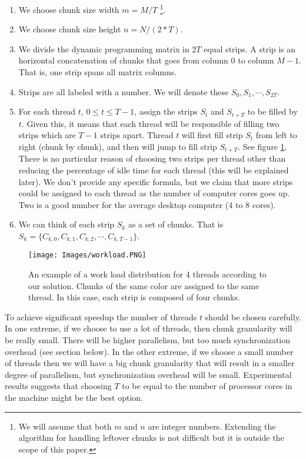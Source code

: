 \documentclass[journal]{IEEEtran}
\begin{document}
\begin{enumerate}
    \item We choose chunk size width $m = M / T$ \footnote{We will assume that both $m$ and $n$ are integer numbers. Extending the algorithm for handling leftover chunks is not difficult but it is outside the scope of this paper.}.
    \item We choose chunk size height $n = N / (2 * T)$.
    \item We divide the dynamic programming matrix in $2T$ equal strips. A strip is an horizontal concatenation of chunks that goes from column $0$ to column $M - 1$. That is, one strip spans all matrix columns.
    \item Strips are all labeled with a number. We will denote these $S_0, S_1, \cdots, S_{2T}$.
    \item For each thread $t$, $0 \leq t \leq T-1$, assign the strips $S_t$ and $S_{t + T}$ to be filled by $t$. Given this, it means that each thread will be responsible of filling two strips which are $T-1$ strips apart. Thread $t$ will first fill strip $S_t$ from left to right (chunk by chunk), and then will jump to fill strip $S_{t + T}$. See figure \ref{exec}. There is no particular reason of choosing two strips per thread other than reducing the percentage of idle time for each thread (this will be explained later). We don't provide any specific formula, but we claim that more strips could be assigned to each thread as the number of computer cores goes up. Two is a good number for the average desktop computer (4 to 8 cores).  
    \item We can think of each strip $S_k$ as a set of chunks. That is $S_k = \{ C_{k, 0}, C_{k, 1}, C_{k,2}, \cdots, C_{k,T-1}\}$. 
\end{enumerate}

\begin{figure}[h]
  \begin{center}
    \texttt{[image: Images/workload.PNG]}
  \end{center}
  \caption{An example of a work load distribution for 4 threads according to our solution. Chunks of the same color are assigned to the same thread. In this case, each strip is composed of four chunks.}
  \label{exec}
\end{figure}

To achieve significant speedup the number of threads $t$ should be chosen carefully. In one extreme, if we choose to use a lot of threads, then chunk granularity will be really small. There will be higher parallelism, but too much synchronization overhead (see section below). In the other extreme, if we choose a small number of threads then we will have a big chunk granularity that will result in a smaller degree of parallelism, but synchronization overhead will be small. Experimental results suggests that choosing $T$ to be equal to the number of processor cores in the machine might be the best option. 
\end{document}
